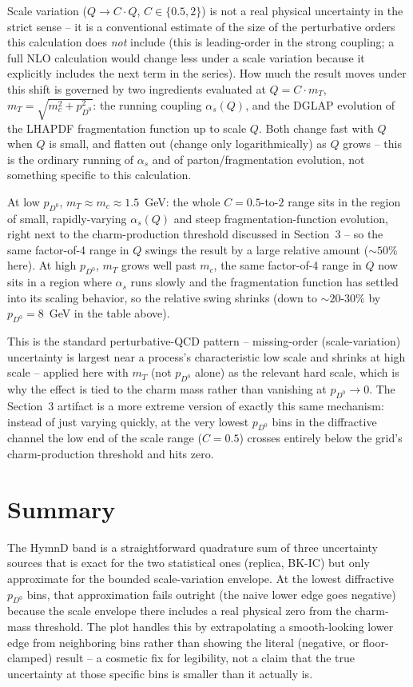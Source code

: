 \documentclass[11pt]{article}
\begin{document}
Scale variation ($Q\to C\cdot Q$, $C\in\{0.5,2\}$) is not a real physical
uncertainty in the strict sense -- it is a conventional estimate of the
size of the perturbative orders this calculation does \emph{not} include
(this is leading-order in the strong coupling; a full NLO calculation would
change less under a scale variation because it explicitly includes the next
term in the series). How much the result moves under this shift is
governed by two ingredients evaluated at $Q=C\cdot m_T$, $m_T=\sqrt{m_c^2+p_{D^0}^2}$:
the running coupling $\alpha_s(Q)$, and the DGLAP evolution of the LHAPDF
fragmentation function up to scale $Q$. Both change fast with $Q$ when $Q$
is small, and flatten out (change only logarithmically) as $Q$ grows --
this is the ordinary running of $\alpha_s$ and of parton/fragmentation
evolution, not something specific to this calculation.

At low $p_{D^0}$, $m_T\approx m_c\approx1.5$~GeV: the whole $C=0.5$-to-$2$
range sits in the region of small, rapidly-varying $\alpha_s(Q)$ and steep
fragmentation-function evolution, right next to the charm-production
threshold discussed in Section~3 -- so the same factor-of-4 range in $Q$
swings the result by a large relative amount ($\sim\!50\%$ here). At high
$p_{D^0}$, $m_T$ grows well past $m_c$, the same factor-of-4 range in $Q$
now sits in a region where $\alpha_s$ runs slowly and the fragmentation
function has settled into its scaling behavior, so the relative swing
shrinks (down to $\sim\!20$-$30\%$ by $p_{D^0}=8$~GeV in the table above).

This is the standard perturbative-QCD pattern -- missing-order
(scale-variation) uncertainty is largest near a process's characteristic
low scale and shrinks at high scale -- applied here with $m_T$ (not
$p_{D^0}$ alone) as the relevant hard scale, which is why the effect is
tied to the charm mass rather than vanishing at $p_{D^0}\to0$. The Section~3
artifact is a more extreme version of exactly this same mechanism: instead
of just varying quickly, at the very lowest $p_{D^0}$ bins in the
diffractive channel the low end of the scale range ($C=0.5$) crosses
entirely below the grid's charm-production threshold and hits zero.

\section{Summary}

The HymnD band is a straightforward quadrature sum of three uncertainty
sources that is exact for the two statistical ones (replica, BK-IC) but
only approximate for the bounded scale-variation envelope. At the lowest
diffractive $p_{D^0}$ bins, that approximation fails outright (the naive
lower edge goes negative) because the scale envelope there includes a real
physical zero from the charm-mass threshold. The plot handles this by
extrapolating a smooth-looking lower edge from neighboring bins rather than
showing the literal (negative, or floor-clamped) result -- a cosmetic fix
for legibility, not a claim that the true uncertainty at those specific
bins is smaller than it actually is.
\end{document}
